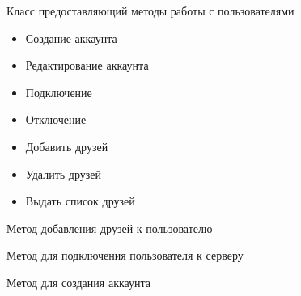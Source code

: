 \documentclass[letterpaper,10pt,english]{sphinxmanual}
\begin{document}
\begin{fulllineitems}
\label{userManager:mainServer.userManager.UserManager}
Класс предоставляющий методы работы с пользователями
\begin{itemize}
\item {} 
Создание аккаунта

\item {} 
Редактирование аккаунта

\item {} 
Подключение

\item {} 
Отключение

\item {} 
Добавить друзей

\item {} 
Удалить друзей

\item {} 
Выдать список друзей

\end{itemize}

\begin{fulllineitems}
\label{userManager:mainServer.userManager.UserManager.addFriends}
Метод добавления друзей к пользователю

\end{fulllineitems}


\begin{fulllineitems}
\label{userManager:mainServer.userManager.UserManager.connectUser}
Метод для подключения пользователя к серверу

\end{fulllineitems}


\begin{fulllineitems}
\label{userManager:mainServer.userManager.UserManager.createAccount}
Метод для создания аккаунта


\end{fulllineitems}
\end{fulllineitems}
\end{document}
